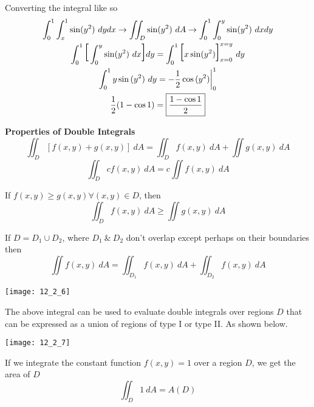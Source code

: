 \documentclass{article}
\begin{document}
  Converting the integral like so
  \[
    \begin{gathered}
    \int^{1}_{0} \int^{1}_{x} \sin(y^{2}) ~ dydx \to \iint_D \sin(y^{2})~dA \to \int^{1}_{0} \int^{y}_{0} \sin(y^{2}) ~dxdy\\
    \int^{1}_{0} \text{\huge{[}} \int^{y}_{0} \sin(y^{2})~dx \text{\huge{]}} dy = \int^{1}_{0} \text{\huge{[}} x\sin(y^{2}) \text{\huge{]}}^{x=y}_{x=0}~dy\\
    \int^{1}_{0} y\sin{(y^{2})}~dy = -\frac{1}{2}\cos{(y^{2})} \bigg|^{1}_{0}\\
    \frac{1}{2}(1-\cos{1})=\boxed{\frac{1-\cos{1}}{2}} 
    \end{gathered}
  \]
 
  \textbf{Properties of Double Integrals}
  \[
    \iint_D [f(x,y)+g(x,y)]~dA = \iint_D f(x,y)~dA + \iint g(x,y)~dA
  \]
  \[
    \iint_D cf(x,y)~dA = c \iint f(x,y)~dA
  \]

  If $ f(x,y) \ge g(x,y) \forall (x,y) \in D $, then
  \[
    \iint_D f(x,y)~dA \ge \iint g(x,y)~dA
  \]

  If $ D=D_1 \cup D_2 $, where $ D_1 ~\&~ D_2 $ don't overlap except perhaps on their boundaries then
  \[
    \iint f(x,y)~dA = \iint_{D_1} f(x,y)~dA + \iint_{D_2} f(x,y)~dA
  \]

  \begin{center}
    \texttt{[image: 12\_2\_6]}
  \end{center}

  The above integral can be used to evaluate double integrals over regions $ D $ that can be expressed as a union of regions of type I or type II. As shown below.
  \begin{center}
    \texttt{[image: 12\_2\_7]}
  \end{center}

  If we integrate the constant function $ f(x,y)=1 $ over a region $ D $, we get the area of $ D $
  \[
    \iint_D 1~dA = A(D)
  \]
\end{document}
